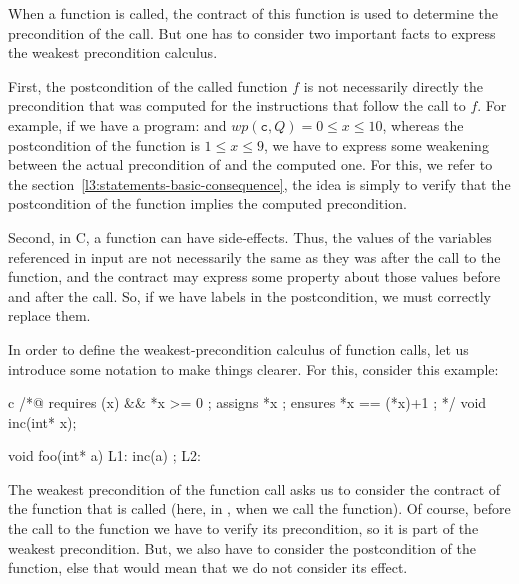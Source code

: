 

When a function is called, the contract of this function is used to determine
the precondition of the call. But one has to consider two important facts to
express the weakest precondition calculus.



First, the postcondition of the called function $f$ is not necessarily
directly the precondition that was computed for the instructions that follow
the call to $f$. For example, if we have a program: 
and $wp(\texttt{c}, Q) = 0 \leq x \leq 10$, whereas the postcondition of the
function  is $1 \leq x \leq 9$, we have to express some
weakening between the actual precondition of  and the computed
one. For this, we refer to the section~\ref{l3:statements-basic-consequence},
the idea is simply to verify that the postcondition of the function implies
the computed precondition.



Second, in C, a function can have side-effects. Thus, the values of the
variables referenced in input are not necessarily the same as they was after the
call to the function, and the contract may express some property about those
values before and after the call. So, if we have labels in the postcondition,
we must correctly replace them.



In order to define the weakest-precondition calculus of function calls, let
us introduce some notation to make things clearer. For this, consider this
example:


\begin{CodeBlock}{c}
/*@ requires \valid(x) && *x >= 0 ;
    assigns *x ;
    ensures *x == \old(*x)+1 ; */
void inc(int* x);

void foo(int* a){
  L1:
  inc(a) ;
  L2:
}
\end{CodeBlock}




The weakest precondition of the function call asks us to consider the contract
of the function that is called (here, in , when we call the
 function). Of course, before the call to the function we have
to verify its precondition, so it is part of the weakest precondition. But, we
also have to consider the postcondition of the function, else that would mean
that we do not consider its effect.




